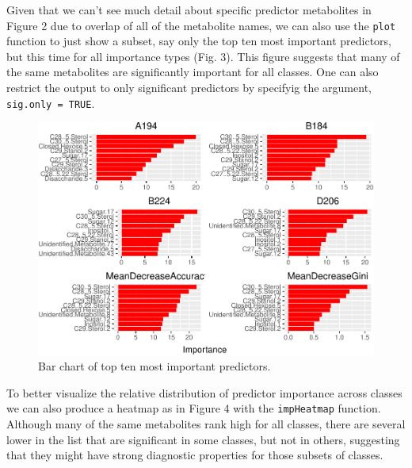 Given that we can't see much detail about specific predictor metabolites
in Figure 2 due to overlap of all of the metabolite names, we can also
use the \texttt{plot} function to just show a subset, say only the top
ten most important predictors, but this time for all importance types
(Fig. 3). This figure suggests that many of the same metabolites are
significantly important for all classes. One can also restrict the
output to only significant predictors by specifyig the argument,
\texttt{sig.only\ =\ TRUE}.

\begin{Schunk}
\begin{figure}
\includegraphics{archer_files/figure-latex/plot_imp2-1} \caption[Bar chart of top ten most important predictors]{Bar chart of top ten most important predictors.}\label{fig:plot_imp2}
\end{figure}
\end{Schunk}

To better visualize the relative distribution of predictor importance
across classes we can also produce a heatmap as in Figure 4 with the
\texttt{impHeatmap} function. Although many of the same metabolites rank
high for all classes, there are several lower in the list that are
significant in some classes, but not in others, suggesting that they
might have strong diagnostic properties for those subsets of classes.

